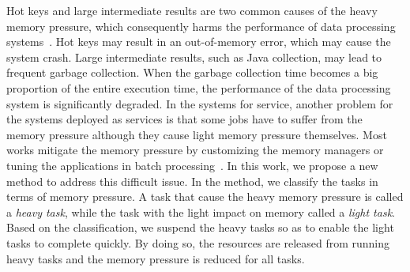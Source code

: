 
Hot keys and large intermediate results are two common causes of the heavy memory pressure, which consequently harms the performance of data processing systems~\cite{fang2015interruptible}. Hot keys may result in an out-of-memory error, which may cause the system crash. Large intermediate results, such as Java collection, may lead to frequent garbage collection. When the garbage collection time becomes a big proportion of the entire execution time, the performance of the data processing system is significantly degraded. 
In the systems for service, another problem for the systems deployed as services is that some jobs have to suffer from the memory pressure although they cause light memory pressure themselves. Most works mitigate the memory pressure by customizing the memory managers or tuning the applications in batch processing~\cite{www:spark-tuning, nguyen2015facade, fang2015interruptible, lulu:deca, nguyen:yak}. In this work, we propose a new method to address this difficult issue. In the method, we classify the tasks in terms of memory pressure. A task that cause the heavy memory pressure is called a \textit{heavy task}, while the task with the light impact on memory called a \textit{light task}. Based on the classification, we suspend the heavy tasks so as to enable the light tasks to complete quickly. By doing so, the resources are released from running heavy tasks and the memory pressure is reduced for all tasks.

